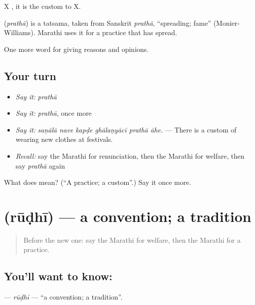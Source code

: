 X   , it is the custom to X.

\begin{cousinweb}
\textbf{} (\emph{prathā}) is a tatsama, taken from Sanskrit \emph{prathā}, \textquotedblleft{}spreading; fame\textquotedblright{} (Monier-Williams). Marathi uses it for a practice that has spread.
\end{cousinweb}

\begin{grammarlens}[title={What you've built}]
One more word for giving reasons and opinions.
\end{grammarlens}

\subsection*{Your turn}
\begin{itemize}
\raggedright
  \item \emph{Say it:} \emph{prathā}
  \item \emph{Say it:} \emph{prathā}, once more
  \item \emph{Say it:} \emph{saṇālā nave kapḍe ghālaṇyācī prathā āhe.} — There is a custom of wearing new clothes at festivals.
  \item \emph{Recall:} say the Marathi for renunciation, then the Marathi for welfare, then say \emph{prathā} again
\end{itemize}

\begin{tcolorbox}[breakable,colback=teal!4,colframe=teal!35!black,title={Before you move on}]
What does  mean? (\textquotedblleft{}A practice; a custom\textquotedblright{}.) Say it once more.
\end{tcolorbox}
\section[\texorpdfstring{\mr{रूढी} (rūḍhī)}{रूढी (rūḍhī)}]{ (rūḍhī) — a convention; a tradition}

\label{lesson:MR-C367-rudhi}



\begin{quote}
Before the new one: say the Marathi for welfare, then the Marathi for a practice.
\end{quote}

\subsection*{You'll want to know: }
\textbf{} — \emph{rūḍhī} — \textquotedblleft{}a convention; a tradition\textquotedblright{}.

